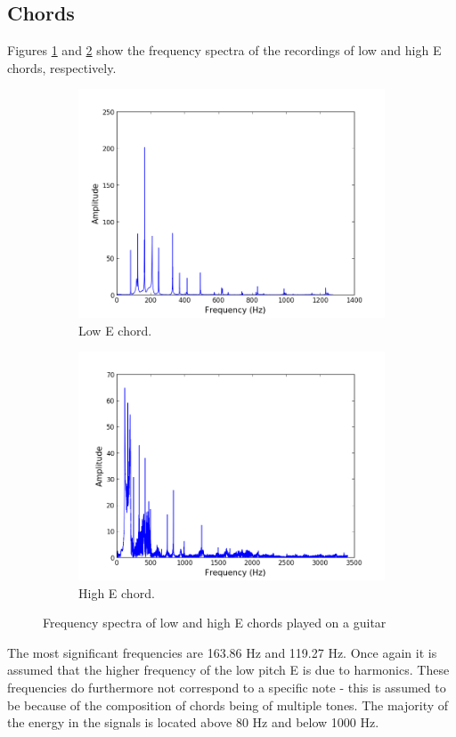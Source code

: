 \subsection{Chords}
Figures \ref{fig:chord_low} and \ref{fig:chord_high} show the frequency spectra of the recordings of low and high E chords, respectively.
\begin{figure}[H]
\centering
\begin{subfigure}{0.49\textwidth}
\centering
\includegraphics[width=\textwidth]{figures/freqanal/chord_low.png}
\caption{Low E chord.}
\label{fig:chord_low}
\end{subfigure}
\begin{subfigure}{0.49\textwidth}
\centering
\includegraphics[width = \textwidth]{figures/freqanal/chord_high.png}
\caption{High E chord.}
\label{fig:chord_high}
\end{subfigure}
\caption{Frequency spectra of low and high E chords played on a guitar}
\label{fig:chord}
\end{figure}
The most significant frequencies are 163.86 Hz and 119.27 Hz. Once again it is assumed that the higher frequency of the low pitch E is due to harmonics. These frequencies do furthermore not correspond to a specific note - this is assumed to be because of the composition of chords being of multiple tones. The majority of the energy in the signals is located above 80 Hz and below 1000 Hz.
